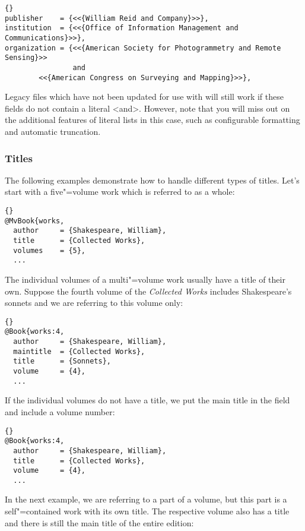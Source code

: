 \documentclass{ltxdockit}[2011/03/25]
\newcommand*{\biblatex}{\sty{biblatex}\xspace}
\begin{document}
\begin{lstlisting}[style=bibtex]{}
publisher    = {<<{William Reid and Company}>>},
institution  = {<<{Office of Information Management and Communications}>>},
organization = {<<{American Society for Photogrammetry and Remote Sensing}>>
                and
		<<{American Congress on Surveying and Mapping}>>},
\end{lstlisting}
%
Legacy files which have not been updated for use with \biblatex will still work if these fields do not contain a literal <and>. However, note that you will miss out on the additional features of literal lists in this case, such as configurable formatting and automatic truncation.

\subsubsection{Titles}
\label{bib:use:ttl}

The following examples demonstrate how to handle different types of titles. Let's start with a five"=volume work which is referred to as a whole:

\begin{lstlisting}[style=bibtex]{}
@MvBook{works,
  author     = {Shakespeare, William},
  title      = {Collected Works},
  volumes    = {5},
  ...
\end{lstlisting}
%
The individual volumes of a multi"=volume work usually have a title of their own. Suppose the fourth volume of the \emph{Collected Works} includes Shakespeare's sonnets and we are referring to this volume only:

\begin{lstlisting}[style=bibtex]{}
@Book{works:4,
  author     = {Shakespeare, William},
  maintitle  = {Collected Works},
  title      = {Sonnets},
  volume     = {4},
  ...
\end{lstlisting}
%
If the individual volumes do not have a title, we put the main title in the  field and include a volume number:

\begin{lstlisting}[style=bibtex]{}
@Book{works:4,
  author     = {Shakespeare, William},
  title      = {Collected Works},
  volume     = {4},
  ...
\end{lstlisting}
%
In the next example, we are referring to a part of a volume, but this part is a self"=contained work with its own title. The respective volume also has a title and there is still the main title of the entire edition:
\end{document}
